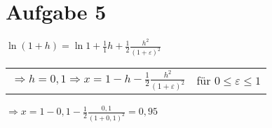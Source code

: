 \documentclass[11pt,a4paper]{article}
\begin{document}
	\section*{Aufgabe 5}
		$\ln \left( 1 + h \right) = \ln 1 + \frac{1}{1}h + \frac{1}{2}\frac{h^2}{\left( 1 + \varepsilon \right)^2}$\\
		\begin{tabular}{lr}
			$\Rightarrow h = 0,1 \Rightarrow x = 1 - h - \frac{1}{2} \frac{h^2}{\left( 1+ \varepsilon \right)^2}$&für $0 \leq \varepsilon \leq 1$\\
		\end{tabular}
		$\Rightarrow x = 1 - 0,1 - \frac{1}{2} \frac{0,1}{\left( 1 + 0,1\right)^2} = 0,95$
\end{document}
